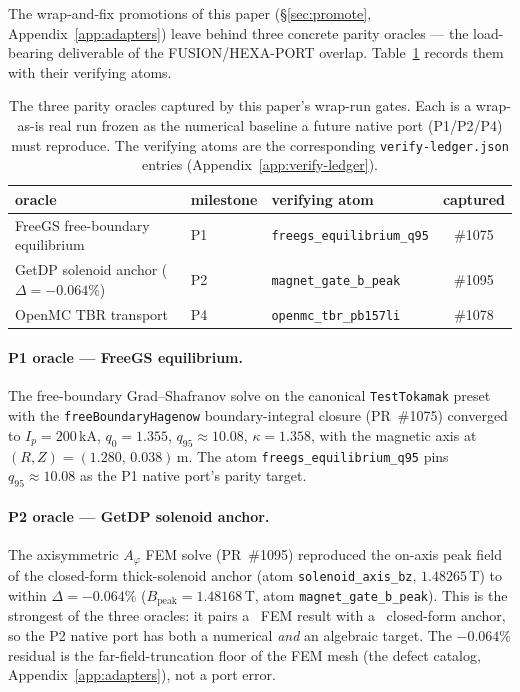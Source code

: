 The wrap-and-fix promotions of this paper (\S\ref{sec:promote},
Appendix~\ref{app:adapters}) leave behind three concrete parity oracles
--- the load-bearing deliverable of the FUSION/HEXA-PORT overlap.
Table~\ref{tab:app:hexaport:oracles} records them with their verifying
atoms.

\begin{table}[h]
\centering
\small
\begin{tabular}{lllc}
\toprule
oracle & milestone & verifying atom & captured \\
\midrule
FreeGS free-boundary equilibrium & P1 & \verb|freegs_equilibrium_q95| & \#1075 \\
GetDP solenoid anchor ($\Delta=-0.064\%$) & P2 & \verb|magnet_gate_b_peak| & \#1095 \\
OpenMC TBR transport & P4 & \verb|openmc_tbr_pb157li| & \#1078 \\
\bottomrule
\end{tabular}
\caption{The three parity oracles captured by this paper's wrap-run
gates. Each is a wrap-as-is real run frozen as the numerical baseline a
future native port (P1/P2/P4) must reproduce. The verifying atoms are
the corresponding \texttt{verify-ledger.json} entries
(Appendix~\ref{app:verify-ledger}).}
\label{tab:app:hexaport:oracles}
\end{table}

\paragraph{P1 oracle --- FreeGS equilibrium.} The free-boundary
Grad--Shafranov solve on the canonical \texttt{TestTokamak} preset with
the \texttt{freeBoundaryHagenow} boundary-integral closure (PR~\#1075)
converged to $I_p = 200$\,kA, $q_0 = 1.355$, $q_{95}\approx10.08$,
$\kappa = 1.358$, with the magnetic axis at $(R,Z)=(1.280,\,0.038)$\,m.
The atom \verb|freegs_equilibrium_q95| pins $q_{95}\approx10.08$ as the
P1 native port's parity target.

\paragraph{P2 oracle --- GetDP solenoid anchor.} The axisymmetric
$A_\varphi$ FEM solve (PR~\#1095) reproduced the on-axis peak field of
the closed-form thick-solenoid anchor (atom \verb|solenoid_axis_bz|,
$1.48265$\,T) to within $\Delta=-0.064\%$ ($B_{\text{peak}}=1.48168$\,T,
atom \verb|magnet_gate_b_peak|). This is the strongest of the three
oracles: it pairs a \tierGreen\ FEM result with a \tierBlue\ closed-form
anchor, so the P2 native port has both a numerical \emph{and} an
algebraic target. The $-0.064\%$ residual is the far-field-truncation
floor of the FEM mesh (the defect catalog,
Appendix~\ref{app:adapters}), not a port error.

